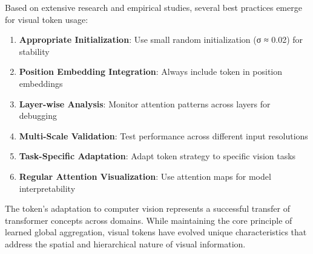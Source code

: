 Based on extensive research and empirical studies, several best practices emerge for visual \cls{} token usage:

\begin{enumerate}
\item \textbf{Appropriate Initialization}: Use small random initialization (σ ≈ 0.02) for stability
\item \textbf{Position Embedding Integration}: Always include \cls{} token in position embeddings
\item \textbf{Layer-wise Analysis}: Monitor attention patterns across layers for debugging
\item \textbf{Multi-Scale Validation}: Test performance across different input resolutions
\item \textbf{Task-Specific Adaptation}: Adapt \cls{} token strategy to specific vision tasks
\item \textbf{Regular Attention Visualization}: Use attention maps for model interpretability
\end{enumerate}

The \cls{} token's adaptation to computer vision represents a successful transfer of transformer concepts across domains. While maintaining the core principle of learned global aggregation, visual \cls{} tokens have evolved unique characteristics that address the spatial and hierarchical nature of visual information.